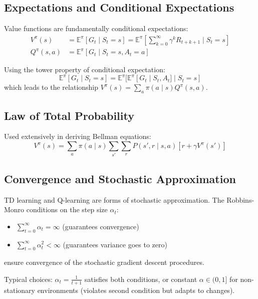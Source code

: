 \documentclass[a4paper, 11pt]{article}
\numberwithin{equation}{section}
\theoremstyle{plain}
\theoremstyle{definition}
\newcommand{\E}{{\mathbb E}}
\newcommand{\1}{{\mathbbm 1}}
\begin{document}
	\subsection{Expectations and Conditional Expectations}
	
	Value functions are fundamentally conditional expectations:
	\begin{align}
		V^{\pi}(s) &= \E^{\pi}[G_t\;|\; S_t = s] = \E^{\pi} \left[ \sum_{k=0}^{\infty} \gamma^k R_{t+k+1} \;|\; S_t = s \right]\\
		Q^{\pi}(s, a) &= \E^{\pi}[G_t\;|\; S_t = s, A_t = a]
	\end{align}
	
	Using the tower property of conditional expectation:
	\begin{equation}
		\E^{\pi}[G_t\;|\; S_t = s] = \E^{\pi}[\E^{\pi}[G_t\;|\; S_t, A_t]\;|\; S_t = s]
	\end{equation}
	which leads to the relationship $V^{\pi}(s) = \sum_a \pi(a\;|\; s) Q^{\pi}(s, a)$.
	
	\subsection{Law of Total Probability}
	
	Used extensively in deriving Bellman equations:
	\begin{equation}
		V^{\pi}(s) = \sum_{a} \pi(a\;|\; s) \sum_{s'} \sum_{r} P(s', r\;|\; s, a) \left[ r + \gamma V^{\pi}(s') \right]
	\end{equation}
	
	\subsection{Convergence and Stochastic Approximation}
	
	TD learning and Q-learning are forms of stochastic approximation. The Robbins-Monro conditions on the step size $\alpha_t$:
	\begin{itemize}
		\item $\sum_{t=0}^{\infty} \alpha_t = \infty$ (guarantees convergence)
		\item $\sum_{t=0}^{\infty} \alpha_t^2 < \infty$ (guarantees variance goes to zero)
	\end{itemize}
	ensure convergence of the stochastic gradient descent procedures.
	
	Typical choices: $\alpha_t = \frac{1}{t+1}$ satisfies both conditions, or constant $\alpha \in (0, 1]$ for non-stationary environments (violates second condition but adapts to changes).
	
\end{document}
